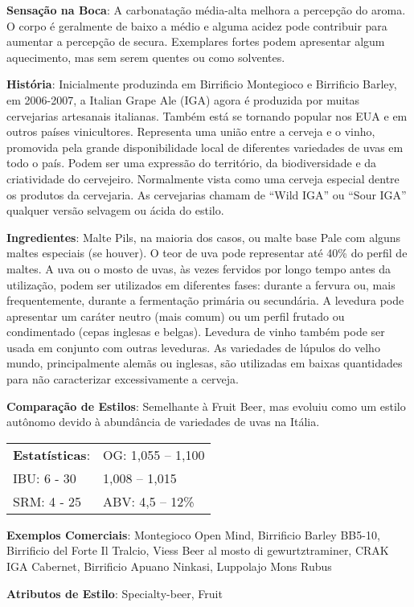 \textbf{Sensação na Boca}: A carbonatação média-alta melhora a percepção do aroma. O corpo é geralmente de baixo a médio e alguma acidez pode contribuir para aumentar a percepção de secura. Exemplares fortes podem apresentar algum aquecimento, mas sem serem quentes ou como solventes.

\textbf{História}: Inicialmente produzinda em Birrificio Montegioco e Birrificio Barley, em 2006-2007, a Italian Grape Ale (IGA) agora é produzida por muitas cervejarias artesanais italianas. Também está se tornando popular nos EUA e em outros países vinicultores. Representa uma união entre a cerveja e o vinho, promovida pela grande disponibilidade local de diferentes variedades de uvas em todo o país. Podem ser uma expressão do território, da biodiversidade e da criatividade do cervejeiro. Normalmente vista como uma cerveja especial dentre os produtos da cervejaria. As cervejarias chamam de “Wild IGA” ou “Sour IGA” qualquer versão selvagem ou ácida do estilo.

\textbf{Ingredientes}: Malte Pils, na maioria dos casos, ou malte base Pale com alguns maltes especiais (se houver). O teor de uva pode representar até 40\% do perfil de maltes. A uva ou o mosto de uvas, às vezes fervidos por longo tempo antes da utilização, podem ser utilizados em diferentes fases: durante a fervura ou, mais frequentemente, durante a fermentação primária ou secundária. A levedura pode apresentar um caráter neutro (mais comum) ou um perfil frutado ou condimentado (cepas inglesas e belgas). Levedura de vinho também pode ser usada em conjunto com outras leveduras. As variedades de lúpulos do velho mundo, principalmente alemãs ou inglesas, são utilizadas em baixas quantidades para não caracterizar excessivamente a cerveja.

\textbf{Comparação de Estilos}: Semelhante à Fruit Beer, mas evoluiu como um estilo autônomo devido à abundância de variedades de uvas na Itália.

\begin{tabular}{@{}p{35mm}p{35mm}@{}}
  \textbf{Estatísticas}: & OG: 1,055 – 1,100 \\
  IBU: 6 - 30 & 1,008 – 1,015 \\
  SRM: 4 - 25 & ABV: 4,5 – 12\%
\end{tabular}

\textbf{Exemplos Comerciais}: Montegioco Open Mind, Birrificio Barley BB5-10, Birrificio del Forte Il Tralcio, Viess Beer al mosto di gewurtztraminer, CRAK IGA Cabernet, Birrificio Apuano Ninkasi, Luppolajo Mons Rubus

\textbf{Atributos de Estilo}: Specialty-beer, Fruit
